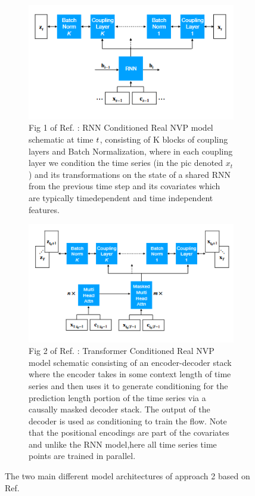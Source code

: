 \documentclass[11pt,headings=small]{scrartcl}
\begin{document}
\begin{figure}
	\centering
	\begin{subfigure}{.5\textwidth}
		\centering
		\includegraphics[width=.95\linewidth]{pics/RNN_NormFlow_Zalando.png}
		\caption{Fig 1 of Ref. \cite{rasul2020multivariate}: RNN Conditioned Real NVP model schematic at time $t$, consisting of K blocks of coupling layers and Batch Normalization,  where in each coupling layer we condition the time series (in the pic denoted $x_t$) and its transformations on the state of a shared RNN from the previous time step and its covariates which are typically timedependent and time independent features.}
		\label{fig:subfig:RNN_NormFlow_Zalando}
	\end{subfigure}%
	\begin{subfigure}{.5\textwidth}
		\centering
		\includegraphics[width=.95\linewidth]{pics/Transformer_NormFlow_Zalando.png}
		\caption{Fig 2 of Ref. \cite{rasul2020multivariate}: Transformer Conditioned Real NVP model schematic consisting of an encoder-decoder stack where the encoder takes in some context length of time series and then uses it to generate conditioning for the prediction length portion of the time series via a causally masked decoder stack. The output of the decoder is used as conditioning to train the flow. Note that the positional encodings are part of the covariates and unlike the RNN model,here all time series time points are trained in parallel.}
		\label{fig:subfig:Transformer_NormFlow_Zalando}
	\end{subfigure}
	\caption{The two main different model architectures of approach 2 based on Ref. \cite{rasul2020multivariate}}
	\label{fig:Approach2}
\end{figure}
\end{document}
